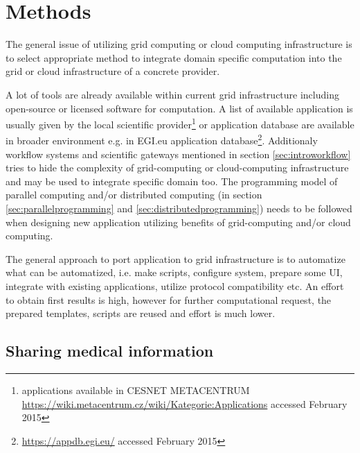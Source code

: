 \chapter{Methods}
\label{sec:methods}

The general issue of utilizing grid computing or cloud computing infrastructure is to select appropriate method to integrate domain specific computation into the grid or cloud infrastructure of a concrete provider. 

A lot of tools are already available within current grid infrastructure including open-source or licensed software for computation. A list of available application is usually given by the local scientific provider\footnote{applications available in CESNET METACENTRUM \url{https://wiki.metacentrum.cz/wiki/Kategorie:Applications} accessed February 2015} or application database are available in broader environment e.g. in EGI.eu application database\footnote{\url{https://appdb.egi.eu/} accessed February 2015}.
Additionaly workflow systems and scientific gateways mentioned in section \ref{sec:introworkflow} tries to hide the complexity of grid-computing or cloud-computing infrastructure and may be used to integrate specific domain too.
The programming model of parallel computing and/or distributed  computing (in section \ref{sec:parallelprogramming} and  \ref{sec:distributedprogramming}) needs to be followed when designing new application utilizing benefits of grid-computing and/or cloud computing.

The general approach to port application to grid infrastructure is to automatize what can be automatized, i.e. make scripts, configure system, prepare some UI, integrate with existing applications, utilize protocol compatibility etc. An effort to obtain first results is high, however for further computational request, the prepared templates, scripts are reused and effort is much lower.  

\section{Sharing medical information}
\label{sec:imaging}



